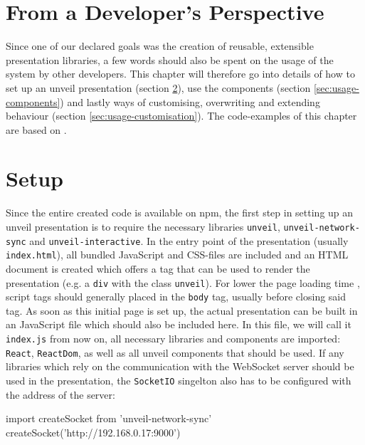 \section{From a Developer's Perspective}
\label{sec:results-developer}

Since one of our declared goals was the creation of reusable, extensible presentation libraries, a few words should also be spent on the usage of the system by other developers. This chapter will therefore go into details of how to set up an unveil presentation (section \ref{sec:usage-setup}), use the components (section \ref{sec:usage-components}) and lastly ways of customising, overwriting and extending behaviour (section \ref{sec:usage-customisation}). The code-examples of this chapter are based on \cite{unveil-client-server}.

\section{Setup}
\label{sec:usage-setup}

Since the entire created code is available on npm, the first step in setting up an unveil presentation is to require the necessary libraries \texttt{unveil}, \texttt{unveil-network-sync} and \texttt{unveil-interactive}. In the entry point of the presentation (usually \texttt{index.html}), all bundled JavaScript and CSS-files are included and an HTML document is created which offers a tag that can be used to render the presentation (e.g. a \texttt{div} with the class \texttt{unveil}). For lower the page loading time \cite{yahoo-speeding-up-website}, script tags should generally placed in the \texttt{body} tag, usually before closing said tag.
As soon as this initial page is set up, the actual presentation can be built in an JavaScript file which should also be included here.
In this file, we will call it \texttt{index.js} from now on, all necessary libraries and components are imported:  \texttt{React}, \texttt{ReactDom}, as well as all unveil components that should be used. If any libraries which rely on the communication with the WebSocket server should be used in the presentation, the \texttt{SocketIO} singelton also has to be configured with the address of the server:
\begin{GenericCode}
import { createSocket } from 'unveil-network-sync'
createSocket('http://192.168.0.17:9000')
\end{GenericCode}

